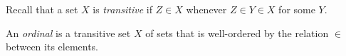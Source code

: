 Recall that a set $X$ is \textit{transitive} if $Z \in X$ whenever $Z \in Y \in X$ for some $Y$.

An \textit{ordinal} is a transitive set $X$ of sets that is well-ordered by the relation $\in$ between its elements.
